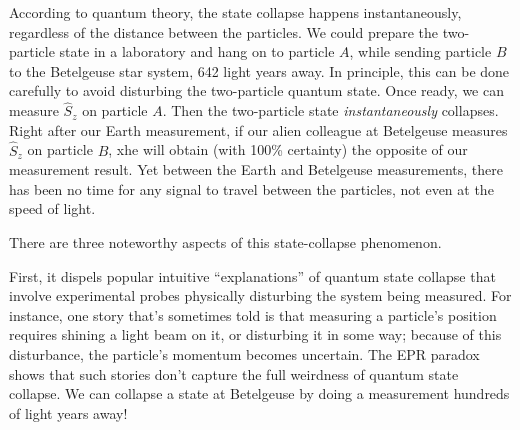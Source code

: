 \documentclass[pra,11pt]{revtex4}
\begin{document}
According to quantum theory, the state collapse happens
instantaneously, regardless of the distance between the particles.  We
could prepare the two-particle state in a laboratory and hang on to
particle $A$, while sending particle $B$ to the Betelgeuse star
system, 642 light years away.  In principle, this can be done
carefully to avoid disturbing the two-particle quantum state.  Once
ready, we can measure $\hat{S}_z$ on particle $A$.  Then the
two-particle state \textit{instantaneously} collapses.  Right after
our Earth measurement, if our alien colleague at Betelgeuse measures
$\hat{S}_z$ on particle $B$, xhe will obtain (with 100\% certainty)
the opposite of our measurement result.  Yet between the Earth and
Betelgeuse measurements, there has been no time for any signal to
travel between the particles, not even at the speed of light.

There are three noteworthy aspects of this state-collapse phenomenon.

First, it dispels popular intuitive ``explanations'' of quantum state
collapse that involve experimental probes physically disturbing the
system being measured.  For instance, one story that's sometimes told
is that measuring a particle's position requires shining a light beam
on it, or disturbing it in some way; because of this disturbance, the
particle's momentum becomes uncertain.  The EPR paradox shows that
such stories don't capture the full weirdness of quantum state
collapse.  We can collapse a state at Betelgeuse by doing a
measurement hundreds of light years away!
\end{document}
